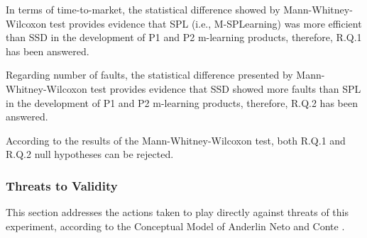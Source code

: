 \begin{table}
\end{table}

In terms of time-to-market, the statistical difference showed by Mann-Whitney-Wilcoxon test provides evidence that SPL (i.e., M-SPLear\allowbreak ning) was more efficient than SSD in the development of P1 and P2 m-learning products, therefore, R.Q.1 has been answered.

Regarding number of faults, the statistical difference presented by Mann-Whitney-Wilcoxon test provides evidence that SSD showed more faults than SPL in the development of P1 and P2 m-learning products, therefore, R.Q.2 has been answered.

According to the results of the Mann-Whitney-Wilcoxon test, both R.Q.1 and R.Q.2 null hypotheses can be rejected.

\subsubsection{Threats to Validity}\label{sec:threats}

This section addresses the actions taken to play directly against threats of this experiment, according to the Conceptual Model of Anderlin Neto and Conte \cite{neto13}.

